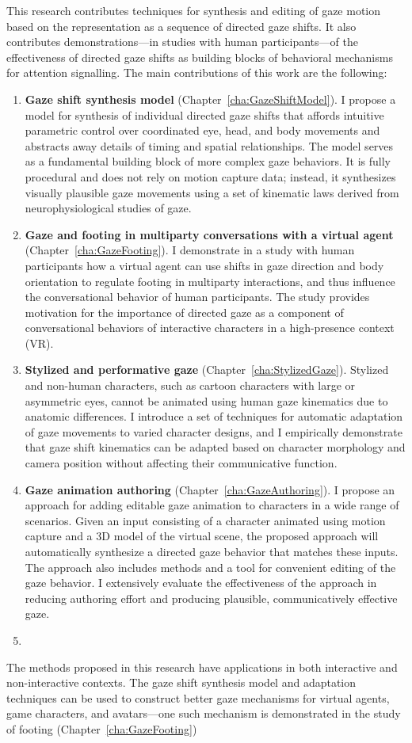 This research contributes techniques for synthesis and editing of gaze motion based on the representation as a sequence of directed gaze shifts. It also contributes demonstrations---in studies with human participants---of the effectiveness of directed gaze shifts as building blocks of behavioral mechanisms for attention signalling. The main contributions of this work are the following:
\begin{enumerate}
\item \textbf{Gaze shift synthesis model} (Chapter~\ref{cha:GazeShiftModel}). I propose a model for synthesis of individual directed gaze shifts that affords intuitive parametric control over coordinated eye, head, and body movements and abstracts away details of timing and spatial relationships. The model serves as a fundamental building block of more complex gaze behaviors. It is fully procedural and does not rely on motion capture data; instead, it synthesizes visually plausible gaze movements using a set of kinematic laws derived from neurophysiological studies of gaze.
\item \textbf{Gaze and footing in multiparty conversations with a virtual agent} (Chapter~\ref{cha:GazeFooting}). I demonstrate in a study with human participants how a virtual agent can use shifts in gaze direction and body orientation to regulate footing in multiparty interactions, and thus influence the conversational behavior of human participants. The study provides motivation for the importance of directed gaze as a component of conversational behaviors of interactive characters in a high-presence context (VR).
\item \textbf{Stylized and performative gaze} (Chapter~\ref{cha:StylizedGaze}). Stylized and non-human characters, such as cartoon characters with large or asymmetric eyes, cannot be animated using human gaze kinematics due to anatomic differences. I introduce a set of techniques for automatic adaptation of gaze movements to varied character designs, and I empirically demonstrate that gaze shift kinematics can be adapted based on character morphology and camera position without affecting their communicative function.
\item \textbf{Gaze animation authoring} (Chapter~\ref{cha:GazeAuthoring}). I propose an approach for adding editable gaze animation to characters in a wide range of scenarios. Given an input consisting of a character animated using motion capture and a 3D model of the virtual scene, the proposed approach will automatically synthesize a directed gaze behavior that matches these inputs. The approach also includes methods and a tool for convenient editing of the gaze behavior. I extensively evaluate the effectiveness of the approach in reducing authoring effort and producing plausible, communicatively effective gaze.
\item
\end{enumerate}

The methods proposed in this research have applications in both interactive and non-interactive contexts. The gaze shift synthesis model and adaptation techniques can be used to construct better gaze mechanisms for virtual agents, game characters, and avatars---one such mechanism is demonstrated in the study of footing (Chapter~\ref{cha:GazeFooting})
